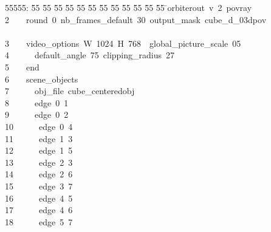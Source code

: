 %
%
\begin{tabbing}
55555: \= 55 \= 55 \= 55 \= 55 \= 55 \= 55 \= 55 \= 55 \= 55 \= 55 \= 55 \= 55 \= \>orbiterout\ v\ 2\ povray\ \\[0pt]
2\>\ \ \ \ round\ 0\ nb\_frames\_default\ 30\ output\_mask\ cube\_d\_03dpov\ \\[0pt]
\>\\[0pt]
3\>\ \ \ \ video\_options\ W\ 1024\ H\ 768\ \ global\_picture\_scale\ 05\ \\[0pt]
4\>\ \ \ \ \ \ default\_angle\ 75\ clipping\_radius\ 27\ \\[0pt]
5\>\ \ \ \ end\ \\[0pt]
6\>\ \ \ \ scene\_objects\ \\[0pt]
7\>\ \ \ \ \ \ obj\_file\ cube\_centeredobj\ \\[0pt]
8\>\ \ \ \ \ \ edge\ 0\ 1\ \\[0pt]
9\>\ \ \ \ \ \ edge\ 0\ 2\ \\[0pt]
10\>\ \ \ \ \ \ edge\ 0\ 4\ \\[0pt]
11\>\ \ \ \ \ \ edge\ 1\ 3\ \\[0pt]
12\>\ \ \ \ \ \ edge\ 1\ 5\ \\[0pt]
13\>\ \ \ \ \ \ edge\ 2\ 3\ \\[0pt]
14\>\ \ \ \ \ \ edge\ 2\ 6\ \\[0pt]
15\>\ \ \ \ \ \ edge\ 3\ 7\ \\[0pt]
16\>\ \ \ \ \ \ edge\ 4\ 5\ \\[0pt]
17\>\ \ \ \ \ \ edge\ 4\ 6\ \\[0pt]
18\>\ \ \ \ \ \ edge\ 5\ 7\ \\[0pt]

\end{tabbing}
